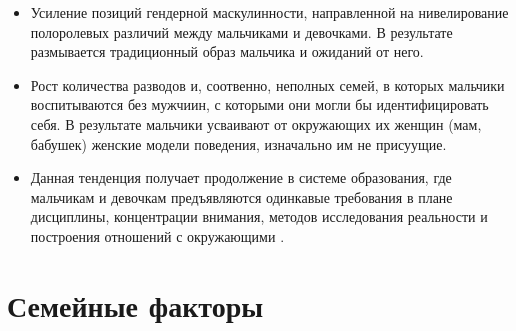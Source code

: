 \documentclass{../../common/thesisbyxetex}
\begin{document}
\begin{itemize}
 \item Усиление позиций гендерной маскулинности, направленной на нивелирование полоролевых различий 
между мальчиками и девочками. В результате размывается традиционный образ мальчика и ожиданий от 
него.

\item Рост количества разводов и, соотвенно, неполных семей, в которых мальчики воспитываются без 
мужчиин, с которыми они могли бы идентифицировать себя. В результате мальчики усваивают от 
окружающих их женщин (мам, бабушек) женские модели поведения, изначально им не присуущие.

\item Данная тенденция получает продолжение в системе образования, где мальчикам и девочкам 
предъявляются одинкавые требования в плане дисциплины, концентрации внимания, методов исследования 
реальности и построения отношений с окружающими \cite{md}.

\end{itemize}

\section{Семейные факторы}
\end{document}
